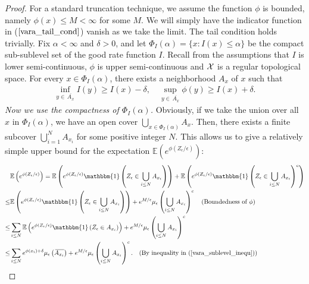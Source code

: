 \documentclass[10pt]{article}
\def\X{{\cal X}}
\newcommand{\e}{\mathbb{E}}
\newcommand{\olsi}[1]{\,\overline{\!{#1}}}
\newenvironment{Proof of lemma}{\noindent{\bf Proof of Lemma}}{\hfill$\Box$\newline}
\newenvironment{Proof of claim}{\noindent{\bf Proof of claim}}{\hfill$\Box$\newline}
\newenvironment{Proof of theorem}{\noindent{\bf Proof of Theorem}}{\hfill\scriptsize{$\Box$}\newline}
\newenvironment{Proof of theorems}{\noindent{\bf Proof of Theorems}}{\hfill$\Box$\newline}
\newenvironment{Proof of proposition}{\noindent{\bf Proof of Proposition}}{\hfill$\Box$\newline}
\newenvironment{Proof of propositions}{\noindent{\bf Proof of Propositions}}{\hfill$\Box$\newline}
\newenvironment{Proof of exercise}{\noindent{\it Proof of Exercise:}}{\hfill$\Box$}
\numberwithin{equation}{section}
\begin{document}
\begin{proof}
    For a standard truncation technique, we assume the function $\phi$ is bounded, namely $\phi(x) \leq M < \infty$ for some $M$. We will simply have the indicator function in ($\ref{vara_tail_cond}$) vanish as we take the limit. The tail condition holds trivially. Fix  $\alpha < \infty$ and $\delta > 0$, and let $\Phi_I(\alpha) = \{x:I(x)\leq \alpha\}$ be the compact sub-sublevel set of the good rate function $I$. Recall from the assumptions that $I$ is lower semi-continuous, $\phi$ is upper semi-continuous and $\X$ is a regular topological space. For every $x \in \Phi_I(\alpha)$, there exists a neighborhood $A_x$ of $x$ such that
    \begin{align} \label{vara_sublevel_inequ}
        \inf_{y \in \olsi{A_x}} I(y) \geq I(x) - \delta, \quad \sup_{y \in \olsi{A_x}} \phi(y) \geq I(x) + \delta.
    \end{align}
    \textit{Now we use the compactness of $\Phi_I(\alpha)$.} Obviously, if we take the union over all $x$ in  $\Phi_I(\alpha)$, we have an open cover $\bigcup_{x \in \Phi_I(\alpha)} A_x$. Then, there exists a finite subcover $\bigcup_{i=1}^N A_{x_i}$ for some positive integer $N$. This allows us to give a relatively simple upper bound for the expectation $\e\left(e^{\phi(Z_{\epsilon}/\epsilon)}\right)$:
    \begin{align} \label{vara_cover_inequ}
        &\e\left(e^{\phi(Z_{\epsilon}/\epsilon)}\right) = \e\left(e^{\phi(Z_{\epsilon}/\epsilon)}\mathbbm{1}
        \left(Z_{\epsilon} \in \bigcup_{i \leq N} A_{x_i}\right)\right) + \e\left(e^{\phi(Z_{\epsilon}/\epsilon)}\mathbbm{1}
        \left(Z_{\epsilon} \in \bigcup_{i \leq N} A_{x_i}\right)^c\right) \nonumber  \\
        \leq& \e\left(e^{\phi(Z_{\epsilon}/\epsilon)}\mathbbm{1}
        \left(Z_{\epsilon} \in \bigcup_{i \leq N} A_{x_i}\right)\right) + e^{M/\epsilon} \mu_{\epsilon}\left(\bigcup_{i \leq N} A_{x_i}\right)^c \quad \text{(Boundedness of $\phi$)}\nonumber \\
        \leq& \sum_{i \leq N} \e\left(e^{\phi(Z_{\epsilon}/\epsilon)}\mathbbm{1}
        \left(Z_{\epsilon} \in A_{x_i}\right)\right) + e^{M/\epsilon} \mu_{\epsilon}\left(\bigcup_{i \leq N} A_{x_i}\right)^c \nonumber \\
        \leq& \sum_{i \leq N} e^{\phi(x_i)+\delta}\mu_{\epsilon}
        \left(\olsi{A_{x_i}}\right) + e^{M/\epsilon} \mu_{\epsilon}\left(\bigcup_{i \leq N} A_{x_i}\right)^c. \quad \text{(By inequality in $(\ref{vara_sublevel_inequ})$)}
    \end{align}

\end{proof}
\end{document}
